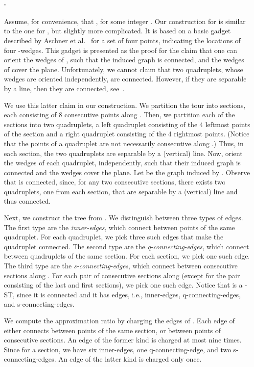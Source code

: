 \documentclass[11pt]{article}
\begin{document}
\paragraph{.}
Assume, for convenience, that , for some integer .
Our construction for  is similar to the one for , but slightly more complicated. It is based on a basic gadget described by Aschner et al.~\cite{AKM13} for a set  of four points, indicating the locations of four -wedges. This gadget is presented as the proof for the claim that one can orient the wedges of , such that the induced graph is connected, and the wedges of  cover the plane.
Unfortunately, we cannot claim that two quadruplets, whose wedges are oriented independently, are connected. However, if they are separable by a line, then they are connected, see~\cite{AKM13}. 

We use this latter claim in our construction.
We partition the tour  into  sections, each consisting of 8 consecutive points along . Then, we partition each of the sections into two quadruplets, a left quadruplet consisting of the 4 leftmost points of the section and a right quadruplet consisting of the 4 rightmost points. (Notice that the points of a quadruplet are not necessarily consecutive along .) Thus, in each section, the two quadruplets are separable by a (vertical) line. Now, orient the wedges of each quadruplet, independently, such that their induced graph is connected and the wedges cover the plane. Let  be the graph induced by . Observe that  is connected, since, for any two consecutive sections, there exists two quadruplets, one from each section, that are separable by a (vertical) line and thus connected.

Next, we construct the tree  from . We distinguish between three types of edges. The first type are the {\em inner-edges}, which connect between points of the same quadruplet. For each quadruplet, we pick three such edges that make the quadruplet connected. The second type are the {\em q-connecting-edges}, which connect between quadruplets of the same section. For each section, we pick one such edge. The third type are the {\em s-connecting-edges}, which connect between consecutive sections along . For each pair of consecutive sections along  (except for the pair consisting of the last and first sections), we pick one such edge. Notice that  is a -ST, since it is connected and it has  edges, i.e.,  inner-edges,  q-connecting-edges, and  s-connecting-edges.

We compute the approximation ratio by charging the edges of . Each edge of  either connects between points of the same section, or between points of consecutive sections. An edge of the former kind is charged at most nine times. Since for a section, we have six inner-edges, one q-connecting-edge, and two s-connecting-edges.
An edge of the latter kind is charged only once. 
\end{document}
